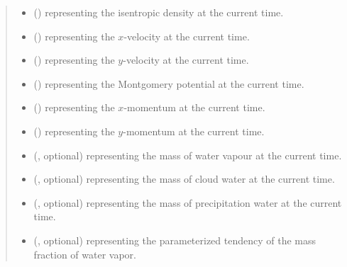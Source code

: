\documentclass[letterpaper,10pt,english]{sphinxmanual}
\begin{document}
\begin{fulllineitems}
\begin{fulllineitems}
\begin{quote}
\begin{description}
\begin{itemize}
\item {} 
 () \textendash{}  representing the isentropic density at the current time.

\item {} 
 () \textendash{}  representing the \(x\)-velocity at the current time.

\item {} 
 () \textendash{}  representing the \(y\)-velocity at the current time.

\item {} 
 () \textendash{}  representing the Montgomery potential at the current time.

\item {} 
 () \textendash{}  representing the \(x\)-momentum at the current time.

\item {} 
 () \textendash{}  representing the \(y\)-momentum at the current time.

\item {} 
 (, optional) \textendash{}  representing the mass of water vapour at the current time.

\item {} 
 (, optional) \textendash{}  representing the mass of cloud water at the current time.

\item {} 
 (, optional) \textendash{}  representing the mass of precipitation water at the current time.

\item {} 
 (, optional) \textendash{}  representing the parameterized tendency of the mass fraction of water vapor.


\end{itemize}
\end{description}
\end{quote}
\end{fulllineitems}
\end{fulllineitems}
\end{document}
